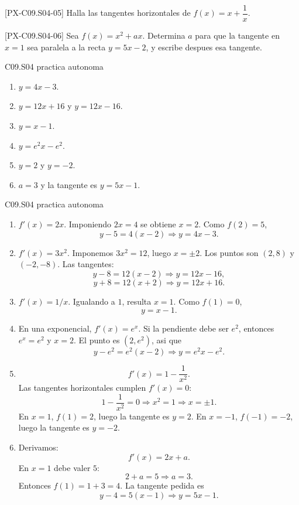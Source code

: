 \begin{exercise}{[PX-C09.S04-05] Halla las tangentes horizontales de \(f(x)=x+\dfrac{1}{x}\).}
\end{exercise}

\begin{exercise}{[PX-C09.S04-06] Sea \(f(x)=x^2+ax\). Determina \(a\) para que la tangente en
\(x=1\) sea paralela a la recta \(y=5x-2\), y escribe despues esa tangente.}
\end{exercise}

\begin{shortanswer}{C09.S04 practica autonoma}
\begin{enumerate}[label=\textbf{PX-C09.S04-\arabic*:}, leftmargin=*]
  \item \(y=4x-3\).
  \item \(y=12x+16\) y \(y=12x-16\).
  \item \(y=x-1\).
  \item \(y=e^2x-e^2\).
  \item \(y=2\) y \(y=-2\).
  \item \(a=3\) y la tangente es \(y=5x-1\).
\end{enumerate}
\end{shortanswer}

\begin{fullsolution}{C09.S04 practica autonoma}
\begin{enumerate}[label=\textbf{PX-C09.S04-\arabic*:}, leftmargin=*]
  \item \(f'(x)=2x\). Imponiendo \(2x=4\) se obtiene \(x=2\). Como \(f(2)=5\),
  \[
  y-5=4(x-2)\Longrightarrow y=4x-3.
  \]

  \item \(f'(x)=3x^2\). Imponemos \(3x^2=12\), luego \(x=\pm 2\). Los puntos son
  \((2,8)\) y \((-2,-8)\). Las tangentes:
  \[
  y-8=12(x-2)\Longrightarrow y=12x-16,
  \]
  \[
  y+8=12(x+2)\Longrightarrow y=12x+16.
  \]

  \item \(f'(x)=1/x\). Igualando a \(1\), resulta \(x=1\). Como \(f(1)=0\),
  \[
  y=x-1.
  \]

  \item En una exponencial, \(f'(x)=e^x\). Si la pendiente debe ser \(e^2\), entonces
  \(e^x=e^2\) y \(x=2\). El punto es \((2,e^2)\), asi que
  \[
  y-e^2=e^2(x-2)\Longrightarrow y=e^2x-e^2.
  \]

  \item
  \[
  f'(x)=1-\frac{1}{x^2}.
  \]
  Las tangentes horizontales cumplen \(f'(x)=0\):
  \[
  1-\frac{1}{x^2}=0 \Longrightarrow x^2=1 \Longrightarrow x=\pm 1.
  \]
  En \(x=1\), \(f(1)=2\), luego la tangente es \(y=2\). En \(x=-1\), \(f(-1)=-2\), luego la
  tangente es \(y=-2\).

  \item Derivamos:
  \[
  f'(x)=2x+a.
  \]
  En \(x=1\) debe valer \(5\):
  \[
  2+a=5 \Longrightarrow a=3.
  \]
  Entonces \(f(1)=1+3=4\). La tangente pedida es
  \[
  y-4=5(x-1)\Longrightarrow y=5x-1.
  \]
\end{enumerate}
\end{fullsolution}

